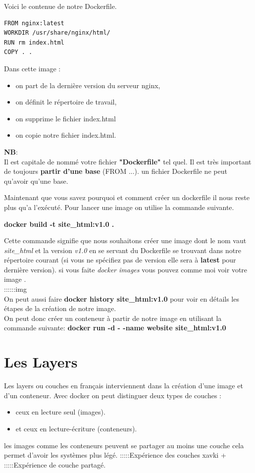 \documentclass[12pt,a4paper]{article}
\begin{document}
Voici le contenue de notre Dockerfile.

\begin{verbatim}
FROM nginx:latest
WORKDIR /usr/share/nginx/html/
RUN rm index.html
COPY . .
\end{verbatim}

Dans cette image :
\begin{itemize}
\item on part de la dernière version du serveur nginx,
\item on définit le répertoire de travail,
\item on supprime le fichier index.html
\item on copie notre fichier index.html.
\end{itemize} 

\textbf{NB}: \\
Il est capitale de nommé votre fichier \textbf{"Dockerfile"} tel quel.
Il est très important de toujours \textbf{partir d'une base} (FROM ...).
un fichier Dockerfile ne peut qu'avoir qu'une base.

Maintenant que vous savez pourquoi et comment créer un dockerfile il nous reste plus
qu'a l'exécuté. Pour lancer une image on utilise la commande suivante.

\textbf{docker build -t site\_html:v1.0 .}

Cette commande signifie que nous souhaitons créer une image dont le nom vaut \textit{site\_html}
et la version \textit{v1.0} en se servant du Dockerfile se trouvant dans notre répertoire 
courant (si vous ne spécifiez pas de version elle sera à \textbf{latest} pour dernière version).
si vous faite \textit{docker images} vous pouvez comme moi voir votre image .\\
::::::img\\
On peut aussi faire \textbf{docker history site\_html:v1.0} pour voir en détails les étapes de 
la création de notre image.\\

On peut donc créer un conteneur à partir de notre image en utilisant la commande suivante:
\textbf{docker run -d - -name website site\_html:v1.0}

\section{Les Layers}
Les layers ou couches en français interviennent dans la création d'une image et d'un conteneur. Avec docker on peut distinguer deux types de couches :
\begin{itemize}
\item ceux en lecture seul (images).
\item et ceux en lecture-écriture (conteneurs).
\end{itemize} 
les images comme les conteneurs peuvent se partager au moins une couche cela permet d'avoir les systèmes plus légé.
:::::Expérience des couches xavki +
:::::Expérience de couche partagé.
\end{document}
